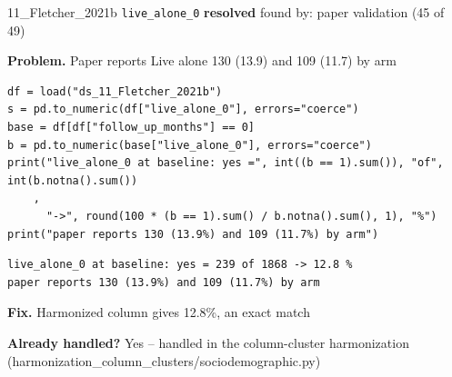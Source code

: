 \documentclass[9pt, t, handout]{beamer}
\newcommand{\ans}[1]{\textcolor{structure.fg}{#1}}
\begin{document}
\begin{frame}[fragile]{11\_Fletcher\_2021b \quad \texttt{live\_alone\_0}}
  {\scriptsize\textcolor{green!45!black}{\textbf{resolved}} \quad
   found by: paper validation \quad (45 of 49)}
  \vspace{3pt}

  {\footnotesize \textbf{Problem.} Paper reports Live alone 130 (13.9) and 109 (11.7) by arm}
  \vspace{4pt}

  \begin{Verbatim}[fontsize=\tiny, frame=single, framesep=2pt, label=\tiny reproduce]
df = load("ds_11_Fletcher_2021b")
s = pd.to_numeric(df["live_alone_0"], errors="coerce")
base = df[df["follow_up_months"] == 0]
b = pd.to_numeric(base["live_alone_0"], errors="coerce")
print("live_alone_0 at baseline: yes =", int((b == 1).sum()), "of", int(b.notna().sum())
    ,
      "->", round(100 * (b == 1).sum() / b.notna().sum(), 1), "%")
print("paper reports 130 (13.9%) and 109 (11.7%) by arm")
  \end{Verbatim}
  \begin{Verbatim}[fontsize=\tiny, frame=single, framesep=2pt, label=\tiny output]
live_alone_0 at baseline: yes = 239 of 1868 -> 12.8 %
paper reports 130 (13.9%) and 109 (11.7%) by arm
  \end{Verbatim}
  \vspace{2pt}

  {\footnotesize \textbf{Fix.} Harmonized column gives 12.8\%, an exact match}
  \vspace{2pt}

  {\footnotesize \textbf{Already handled?} \ans{Yes} -- handled in the column-cluster harmonization
   (harmonization\_column\_clusters/sociodemographic.py)}
\end{frame}
\end{document}
